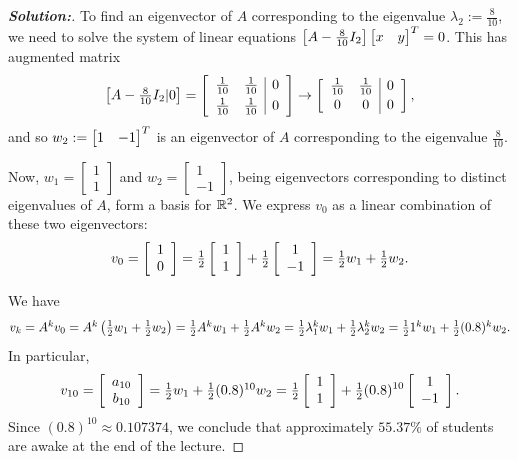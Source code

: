 \documentclass[a4paper]{amsart}
\theoremstyle{definition}
\newenvironment{solution}{\begin{proof}[\textbf{Solution:}] \vphantom{u}}{\end{proof}}
\begin{document}
\begin{solution}
 To find an eigenvector of $A$ corresponding to the eigenvalue
 $\lambda_2 := \frac{8}{10}$, we need to solve the system of linear
 equations
 $\left[A -{\textstyle \frac{8}{10}} I_2\right]\left[\begin{matrix} x & y \end{matrix}\right]^T = 0$. This has
 augmented matrix
 \[
 \left[\begin{matrix} A -{\textstyle \frac{8}{10}} I_2|0 \end{matrix}\right] =
 \left[\begin{array}{cc|c} \frac{1}{10} & \frac{1}{10} & 0\\[3pt]
 \frac{1}{10}
 & \frac{1}{10} & 0\end{array} \right] \to
  \left[\begin{array}{cc|c} \frac{1}{10} & \frac{1}{10} & 0\\[2pt]
 0
 & 0 & 0\end{array} \right],
 \]
 and so $w_2 :=\left[\begin{matrix} 1 & -1\end{matrix}\right]^T$ is an eigenvector of $A$ corresponding to
 the eigenvalue $\frac{8}{10}$.

 Now, $w_1 = \left[\begin{array}{c} 1 \\ 1 \end{array}\right]$
 and $w_2 = \left[\begin{array}{c} 1 \\ -1 \end{array}\right]$, being
 eigenvectors corresponding to distinct eigenvalues of $A$, form a
 basis for ${\mathbb{R}}^2$. We express $v_0$ as a linear combination of these
 two eigenvectors:
 \[
 v_0 =\left[\begin{array}{cc} 1\\ 0 \end{array}\right] = {\textstyle
 \tfrac{1}{2}}\left[\begin{array}{c} 1 \\ 1 \end{array}\right] +
 {\textstyle \tfrac{1}{2}}\left[\begin{array}{c} 1 \\ -1
 \end{array}\right] = {\textstyle \tfrac{1}{2} w_1 + \tfrac{1}{2} w_2}.
 \]

 We have
 \[
   {\textstyle v_k = A^kv_0 =
    A^k\left(\tfrac{1}{2} w_1 + \tfrac{1}{2} w_2\right) =
    \tfrac{1}{2} A^kw_1 + \tfrac{1}{2} A^kw_2 =
    \tfrac{1}{2}\lambda_1^kw_1 + \tfrac{1}{2}\lambda_2^kw_2 =
    \tfrac{1}{2} 1^kw_1 + \tfrac{1}{2}(0.8)^kw_2}.
 \]
 In particular,
 \[
  v_{10} = \left[\begin{array}{cc} a_{10}\\ b_{10} \end{array}\right] =
 {\textstyle \tfrac{1}{2} w_1 + \tfrac{1}{2}(0.8)^{10}w_2} =
 {\textstyle \tfrac{1}{2}}
    \left[\begin{array}{c} 1 \\ 1 \end{array}\right] +
 {\textstyle \tfrac{1}{2}}(0.8)^{10}
    \left[\begin{array}{c} 1 \\ -1 \end{array}\right].
 \]
 Since $(0.8)^{10} \approx 0.107374$, we conclude that
 approximately $55.37\%$ of students are awake at the end of the
 lecture.
\end{solution}
\end{document}
